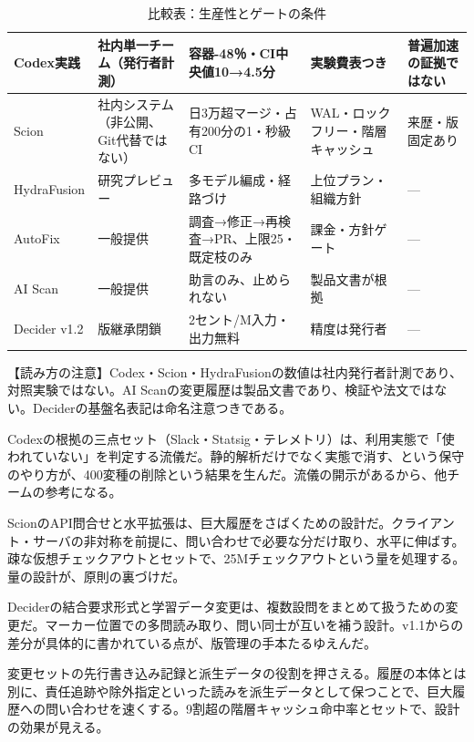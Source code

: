 \documentclass[lualatex,a4paper,10pt]{jlreq}
\begin{document}
\begin{table}[htbp]\centering\footnotesize
\caption{比較表：生産性とゲートの条件}
\begin{tabularx}{0.96\linewidth}{@{}lXXXX@{}}
\toprule
Codex実践 & 社内単一チーム（発行者計測） & 容器-48％・CI中央値10→4.5分 & 実験費表つき & 普遍加速の証拠ではない \\
\midrule
Scion & 社内システム（非公開、Git代替ではない） & 日3万超マージ・占有200分の1・秒級CI & WAL・ロックフリー・階層キャッシュ & 来歴・版固定あり \\
\midrule
HydraFusion & 研究プレビュー & 多モデル編成・経路づけ & 上位プラン・組織方針 & --- \\
\midrule
AutoFix & 一般提供 & 調査→修正→再検査→PR、上限25・既定枝のみ & 課金・方針ゲート & --- \\
\midrule
AI Scan & 一般提供 & 助言のみ、止められない & 製品文書が根拠 & --- \\
\midrule
Decider v1.2 & 版継承閉鎖 & 2セント/M入力・出力無料 & 精度は発行者 & --- \\
\bottomrule
\end{tabularx}
\end{table}
\begin{tcolorbox}[colback=SurveySoft,colframe=SurveyRule,arc=1mm,boxrule=0.4pt,left=2mm,right=2mm]
【読み方の注意】Codex・Scion・HydraFusionの数値は社内発行者計測であり、対照実験ではない。AI Scanの変更履歴は製品文書であり、検証や法文ではない。Deciderの基盤名表記は命名注意つきである。
\end{tcolorbox}
Codexの根拠の三点セット（Slack・Statsig・テレメトリ）は、利用実態で「使われていない」を判定する流儀だ。静的解析だけでなく実態で消す、という保守のやり方が、400変種の削除という結果を生んだ。流儀の開示があるから、他チームの参考になる。

ScionのAPI問合せと水平拡張は、巨大履歴をさばくための設計だ。クライアント・サーバの非対称を前提に、問い合わせで必要な分だけ取り、水平に伸ばす。疎な仮想チェックアウトとセットで、25Mチェックアウトという量を処理する。量の設計が、原則の裏づけだ。

Deciderの結合要求形式と学習データ変更は、複数設問をまとめて扱うための変更だ。マーカー位置での多問読み取り、問い同士が互いを補う設計。v1.1からの差分が具体的に書かれている点が、版管理の手本たるゆえんだ。

変更セットの先行書き込み記録と派生データの役割を押さえる。履歴の本体とは別に、責任追跡や除外指定といった読みを派生データとして保つことで、巨大履歴への問い合わせを速くする。9割超の階層キャッシュ命中率とセットで、設計の効果が見える。
\end{document}
